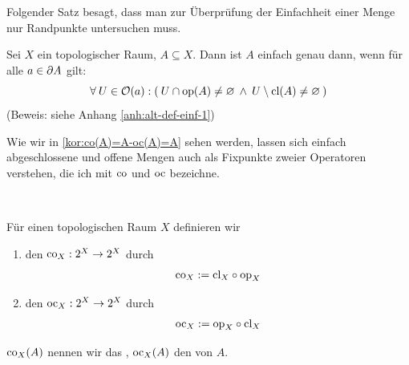     Folgender Satz besagt, dass man zur Überprüfung der Einfachheit einer Menge nur Randpunkte untersuchen muss. 
    \begin{satz}\label{satz:alt-def-einf-1}
        Sei $X$ ein topologischer Raum, $A \subseteq X$. Dann ist $A$ einfach genau dann, wenn für alle $a \in \partial A$ gilt:
        $$\forall\: U \in \mathcal{O}(a): (\: U \cap \text{op}(A) \neq \varnothing \:\land\: U \setminus \text{cl}(A) \neq \varnothing \:) $$
        (Beweis: siehe Anhang \ref{anh:alt-def-einf-1})
    \end{satz}
   
    Wie
    wir in \ref{kor:co(A)=A-oc(A)=A} sehen werden, lassen sich einfach abgeschlossene und offene Mengen auch als Fixpunkte zweier Operatoren verstehen, die ich mit $\text{co}$ und $\text{oc}$ bezeichne.
    \begin{dfn}\label{def:cooc} \ \vspace{8pt}

        \noindent
        Für einen topologischen Raum $X$ definieren wir
        \begin{enumerate}
            \item den  $\text{co}_X: 2^X \rightarrow 2^X$ durch
                \begin{align*}
                    \text{co}_X := \text{cl}_X \circ \text{op}_X 		
                \end{align*} 
            \item den  $\text{oc}_X: 2^X \rightarrow 2^X$ durch
                \begin{align*}
                    \text{oc}_X := \text{op}_X \circ \text{cl}_X 		
                \end{align*} 	
        \end{enumerate}	 

        \noindent
        $\text{co}_X(A)$ nennen wir das , $\text{oc}_X(A)$ den  von $A$.
        
    \end{dfn}


